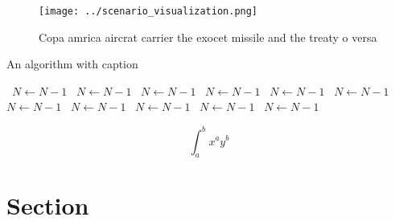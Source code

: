 \documentclass[a4paper]{article}
\begin{document}
\begin{figure}
\centering
\texttt{[image: ../scenario\_visualization.png]}
\caption{Copa amrica aircrat carrier the exocet missile and the treaty o versa
}
\end{figure}
 
\begin{algorithm}
\caption{An algorithm with caption}
\begin{algorithmic}
\    \State $N \gets N - 1$
\    \State $N \gets N - 1$
\    \State $N \gets N - 1$
\    \State $N \gets N - 1$
\    \State $N \gets N - 1$
\    \State $N \gets N - 1$
\    \State $N \gets N - 1$
\    \State $N \gets N - 1$
\    \State $N \gets N - 1$
\    \State $N \gets N - 1$
\    \State $N \gets N - 1$
\EndWhile
\end{algorithmic}
\end{algorithm}

\[ \int_{a}^{b}{x^{a}y^{b}} \]

\section{Section}
\end{document}
